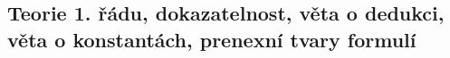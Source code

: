 \subsection{Teorie 1. řádu, dokazatelnost, věta o dedukci, věta o konstantách, prenexní tvary formulí}